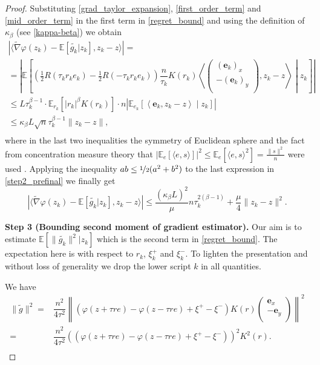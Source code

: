 \documentclass[runningheads]{llncs}
\newcommand{\E}{{\mathbb E}}
\def\E{\mathbb E}
\def\la{\langle}
\def\ra{\rangle}
\begin{document}
\begin{proof}
Substituting \eqref{grad_taylor_expansion}, \eqref{first_order_term} and \eqref{mid_order_term} in the first term in \eqref{regret_bound} and using the definition of $\kappa_{\beta}$ (see \eqref{kappa-beta}) we obtain
\begin{multline}\label{step2_prefinal}
    \left|   \langle \widetilde{\nabla} \varphi(z_k) -  \E \left[\widetilde{g_k} | z_k \right] , z_k - z \rangle \right|
     = \\
     =  \left| \E\left[ \left( \frac{1}{2} R(\tau_k r_k e_k) - \frac{1}{2} R(-\tau_k r_k e_k) \right) \dfrac{n}{\tau_k} K(r_k) \left\la \left(
    \begin{array}{c}
    (\mathbf{e}_k)_x\\
    -(\mathbf{e}_k)_y \\
    \end{array}\right), z_k - z \right\ra \middle| z_k \right] \right| \\
     \leq L\tau_k^{\beta - 1} \cdot \E_{r_k} \left[ |r_k|^{\beta} K(r_k) \right] \cdot n\left|\E_{e_k} \left[\left\la \mathbf{e}_k, z_k-z \right\ra \middle| z_k \right] \right| \\
     \leq 
     \kappa_{\beta} L \sqrt{n} \tau_k^{\beta - 1} \| z_k - z\|, \\
\end{multline}
where in the last two inequalities the symmetry of Euclidean sphere and the fact from concentration measure theory that $\left|\E_{e} \left[\la e, s \ra \right] \right|^2 \leq \E_{e} \left[\la e, s \ra^2 \right] = \frac{\|s\|^2}{n} $  were used . Applying the inequality $ab \leq \nicefrac{1}{2} (a^2 + b^2)$ to the last expression in \eqref{step2_prefinal}  we finally get 
\begin{equation}\label{step2}
    \left|   \langle \widetilde{\nabla} \varphi(z_k) -  \E \left[\widetilde{g_k} | z_k \right] , z_k - z \rangle \right|
    \leq  \dfrac{(\kappa_{\beta} L)^2}{\mu} n \tau_k^{2(\beta-1)} + \dfrac{\mu}{4} \|z_k-z\|^2 .
\end{equation}

{\bf Step 3 (Bounding second moment of gradient estimator). }
Our aim is to estimate $\E \left[ \| \widetilde{g_k} \|^2 | z_k \right]$ which is the second term in \eqref{regret_bound}. The expectation here is with respect to $r_k$, $\xi^+_k$ and $\xi^-_k$. To lighten the presentation and without loss of generality we drop the lower script $k$ in all quantities. 

We have
\begin{equation}
\begin{split}
    \| \widetilde{g} \|^2 =& \dfrac{n^2}{4\tau^2} \left\|(\varphi(z+\tau r e) - \varphi(z - \tau r e) + \xi^+ - \xi^-) K(r) \left(
    \begin{array}{c}
    \mathbf{e}_x\\
    -\mathbf{e}_y \\
    \end{array}\right)\right\|^2 \\
    =& \dfrac{n^2}{4\tau^2} \left((\varphi(z+\tau r e) - \varphi(z - \tau r e) + \xi^+ - \xi^-) \right)^2 K^2(r).\\
\end{split}
\end{equation}


\end{proof}
\end{document}
